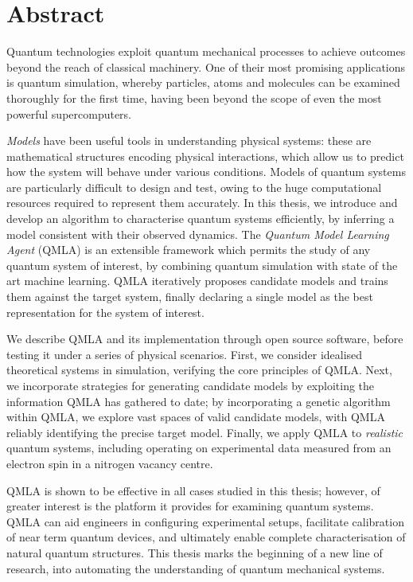 \chapter*{Abstract}

Quantum technologies exploit quantum mechanical processes to achieve outcomes beyond the reach of classical machinery.
One of their most promising applications is quantum simulation, 
    whereby particles, atoms and molecules can be examined thoroughly for the first time, 
    having been beyond the scope of even the most powerful supercomputers. 
\par 
\emph{Models} have been useful tools in understanding physical systems:
    these are mathematical structures encoding physical interactions,
    which allow us to predict how the system will behave under various conditions. 
Models of quantum systems are particularly difficult to design and test, 
    owing to the huge computational resources required to represent them accurately.
In this thesis, we introduce and develop an algorithm to characterise quantum systems efficiently, 
    by inferring a model consistent with their observed dynamics.
The \emph{Quantum Model Learning Agent} (QMLA) is an extensible framework which permits 
    the study of any quantum system of interest, 
    by combining quantum simulation with state of the art machine learning.
QMLA iteratively proposes candidate models and trains them against the target system,
    finally declaring a single model as the best representation for the system of interest.  
\par 

We describe QMLA and its implementation through open source software,
    before testing it under a series of physical scenarios.
First, we consider idealised theoretical systems in simulation, 
    verifying the core principles of QMLA. 
Next, we incorporate strategies for generating candidate models
    by exploiting the information QMLA has gathered to date;
    by incorporating a genetic algorithm within QMLA, 
    we explore vast spaces of valid candidate models, with QMLA reliably identifying the precise target model.
Finally, we apply QMLA to \emph{realistic} quantum systems, 
    including operating on experimental data measured from an electron spin in a nitrogen vacancy centre. 

\par 

QMLA is shown to be effective in all cases studied in this thesis;
    however, of greater interest is the platform it provides for examining quantum systems.
QMLA can aid engineers in configuring experimental setups, 
    facilitate calibration of near term quantum devices,
    and ultimately enable complete characterisation of natural quantum structures.
This thesis marks the beginning of a new line of research, 
    into automating the understanding of quantum mechanical systems.
